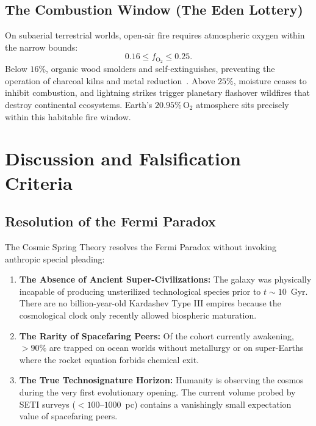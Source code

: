 \documentclass[11pt,a4paper]{article}
\begin{document}
\subsection{The Combustion Window (The Eden Lottery)}

On subaerial terrestrial worlds, open-air fire requires atmospheric oxygen within the narrow bounds:
\begin{equation}
0.16 \le f_{\mathrm{O}_2} \le 0.25.
\end{equation}
Below $16\%$, organic wood smolders and self-extinguishes, preventing the operation of charcoal kilns and metal reduction~\cite{belcher2010}. Above $25\%$, moisture ceases to inhibit combustion, and lightning strikes trigger planetary flashover wildfires that destroy continental ecosystems. Earth's $20.95\%\,\mathrm{O}_2$ atmosphere sits precisely within this habitable fire window.

\section{Discussion and Falsification Criteria}
\label{sec:discussion}

\subsection{Resolution of the Fermi Paradox}

The Cosmic Spring Theory resolves the Fermi Paradox without invoking anthropic special pleading:
\begin{enumerate}
    \item \textbf{The Absence of Ancient Super-Civilizations:} The galaxy was physically incapable of producing unsterilized technological species prior to $t \sim 10$~Gyr. There are no billion-year-old Kardashev Type III empires because the cosmological clock only recently allowed biospheric maturation.
    \item \textbf{The Rarity of Spacefaring Peers:} Of the cohort currently awakening, $>90\%$ are trapped on ocean worlds without metallurgy or on super-Earths where the rocket equation forbids chemical exit.
    \item \textbf{The True Technosignature Horizon:} Humanity is observing the cosmos during the very first evolutionary opening. The current volume probed by SETI surveys ($<100\text{--}1000$~pc) contains a vanishingly small expectation value of spacefaring peers.
\end{enumerate}
\end{document}
